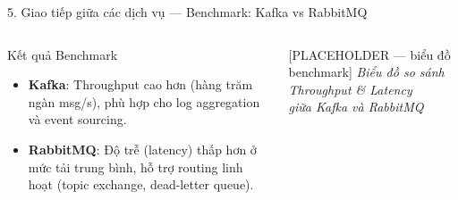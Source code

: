 \documentclass[aspectratio=169,compress]{beamer}
\begin{document}
\begin{frame}{5. Giao tiếp giữa các dịch vụ --- Benchmark: Kafka vs RabbitMQ}
\begin{columns}[T]
\begin{block}{Kết quả Benchmark}
\begin{itemize}
  \item \textbf{Kafka}: Throughput cao hơn (hàng trăm ngàn msg/s), phù hợp cho log aggregation và event sourcing.
  \item \textbf{RabbitMQ}: Độ trễ (latency) thấp hơn ở mức tải trung bình, hỗ trợ routing linh hoạt (topic exchange, dead-letter queue).
\end{itemize}
\end{block}

\begin{alertblock}{[PLACEHOLDER --- biểu đồ benchmark]}
\centering
\textit{Biểu đồ so sánh Throughput \& Latency}\\
\textit{giữa Kafka và RabbitMQ}
\end{alertblock}
\end{columns}
\end{frame}
\end{document}
